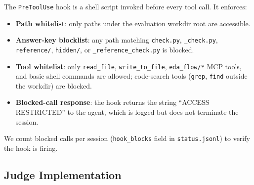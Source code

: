 The \texttt{PreToolUse} hook is a shell script invoked before every tool call. It enforces:
\begin{itemize}
    \item \textbf{Path whitelist}: only paths under the evaluation workdir root are accessible.
    \item \textbf{Answer-key blocklist}: any path matching \texttt{check.py}, \texttt{\_check.py}, \texttt{reference/}, \texttt{hidden/}, or \texttt{\_reference\_check.py} is blocked.
    \item \textbf{Tool whitelist}: only \texttt{read\_file}, \texttt{write\_to\_file}, \texttt{eda\_flow/*} MCP tools, and basic shell commands are allowed; code-search tools (\texttt{grep}, \texttt{find} outside the workdir) are blocked.
    \item \textbf{Blocked-call response}: the hook returns the string ``ACCESS RESTRICTED'' to the agent, which is logged but does not terminate the session.
\end{itemize}
We count blocked calls per session (\texttt{hook\_blocks} field in \texttt{status.jsonl}) to verify the hook is firing.

\subsection{Judge Implementation}
\label{sec:judge-impl}

